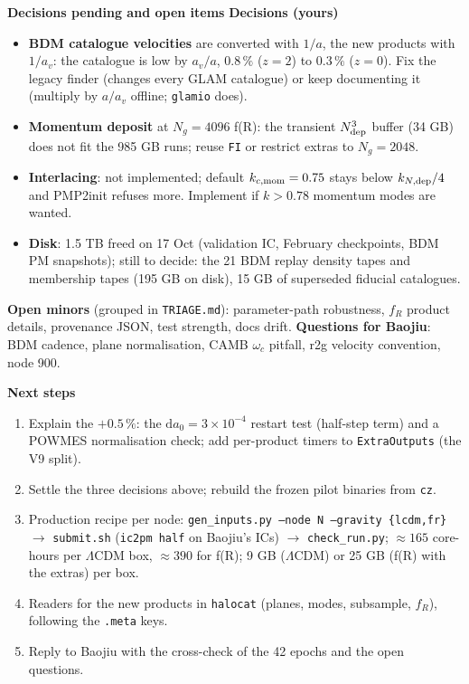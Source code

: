 \documentclass[UTF8]{beamer}
\begin{document}
\begin{frame}{\textbf{Decisions pending and open items}}
  \footnotesize
  \textbf{Decisions (yours)}
  \begin{itemize}
    \item \textbf{BDM catalogue velocities} are converted with $1/a$, the new products with $1/a_v$: the catalogue
      is low by $a_v/a$, $0.8\,\%$ ($z = 2$) to $0.3\,\%$ ($z = 0$). Fix the legacy finder (changes every GLAM
      catalogue) or keep documenting it (multiply by $a/a_v$ offline; \texttt{glamio} does).
    \item \textbf{Momentum deposit} at $N_g = 4096$ f(R): the transient $N_{\rm dep}^3$ buffer (34 GB) does not fit the
      985 GB runs; reuse \texttt{FI} or restrict extras to $N_g = 2048$.
    \item \textbf{Interlacing}: not implemented; default $k_{c,\rm mom} = 0.75$ stays below $k_{N,\rm dep}/4$ and
      PMP2init refuses more. Implement if $k > 0.78$ momentum modes are wanted.
    \item \textbf{Disk}: 1.5 TB freed on 17 Oct (validation IC, February checkpoints, BDM PM snapshots); still to
      decide: the 21 BDM replay density tapes and membership tapes (195 GB on disk), 15 GB of superseded fiducial catalogues.
  \end{itemize}
  \textbf{Open minors} (grouped in \texttt{TRIAGE.md}): parameter-path robustness, $f_R$ product details, provenance
  JSON, test strength, docs drift. \quad \textbf{Questions for Baojiu}: BDM cadence, plane normalisation, CAMB
  $\omega_c$ pitfall, r2g velocity convention, node 900.
\end{frame}

\begin{frame}{\textbf{Next steps}}
  \small
  \begin{enumerate}
    \item Explain the $+0.5\,\%$: the $\mathrm{d}a_0 = 3\times10^{-4}$ restart test (half-step term) and a POWMES
      normalisation check; add per-product timers to \texttt{ExtraOutputs} (the V9 split).
    \item Settle the three decisions above; rebuild the frozen pilot binaries from \texttt{cz}.
    \item Production recipe per node: \texttt{gen\_inputs.py --node N --gravity \{lcdm,fr\}} $\to$ \texttt{submit.sh}
      (\texttt{ic2pm half} on Baojiu's ICs) $\to$ \texttt{check\_run.py}; $\approx 165$ core-hours per $\Lambda$CDM box,
      $\approx 390$ for f(R); 9 GB ($\Lambda$CDM) or 25 GB (f(R) with the extras) per box.
    \item Readers for the new products in \texttt{halocat} (planes, modes, subsample, $f_R$), following the
      \texttt{.meta} keys.
    \item Reply to Baojiu with the cross-check of the 42 epochs and the open questions.
  \end{enumerate}
\end{frame}
\end{document}
